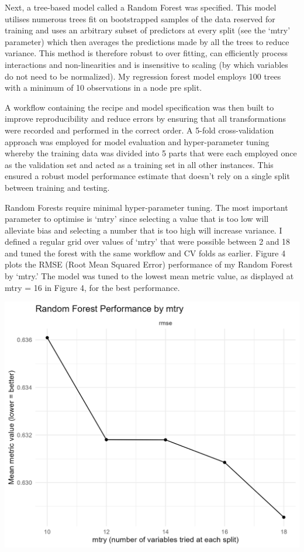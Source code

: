 \documentclass[11pt,preprint]{elsarticle}
\let\origfigure\figure
\let\endorigfigure\endfigure
\renewenvironment{figure}[1][2] {
    \expandafter\origfigure\expandafter[H]
} {
    \endorigfigure
}
\numberwithin{equation}{section}
\numberwithin{figure}{section}
\numberwithin{table}{section}
\begin{document}
Next, a tree-based model called a Random Forest was specified. This
model utilises numerous trees fit on bootstrapped samples of the data
reserved for training and uses an arbitrary subset of predictors at
every split (see the `mtry' parameter) which then averages the
predictions made by all the trees to reduce variance. This method is
therefore robust to over fitting, can efficiently process interactions
and non-linearities and is insensitive to scaling (by which variables do
not need to be normalized). My regression forest model employs 100 trees
with a minimum of 10 observations in a node pre split.

A workflow containing the recipe and model specification was then built
to improve reproducibility and reduce errors by ensuring that all
transformations were recorded and performed in the correct order. A
5-fold cross-validation approach was employed for model evaluation and
hyper-parameter tuning whereby the training data was divided into 5
parts that were each employed once as the validation set and acted as a
training set in all other instances. This ensured a robust model
performance estimate that doesn't rely on a single split between
training and testing.

Random Forests require minimal hyper-parameter tuning. The most
important parameter to optimise is `mtry' since selecting a value that
is too low will alleviate bias and selecting a number that is too high
will increase variance. I defined a regular grid over values of `mtry'
that were possible between 2 and 18 and tuned the forest with the same
workflow and CV folds as earlier. Figure 4 plots the RMSE (Root Mean
Squared Error) performance of my Random Forest by `mtry.' The model was
tuned to the lowest mean metric value, as displayed at mtry = 16 in
Figure 4, for the best performance.

\begin{figure}[H]

{\centering \includegraphics[width=0.8\linewidth]{writeup/fig4} 

}

\caption{Random Forest Performance by 'mtry'}\label{fig:fig4}
\end{figure}
\end{document}
